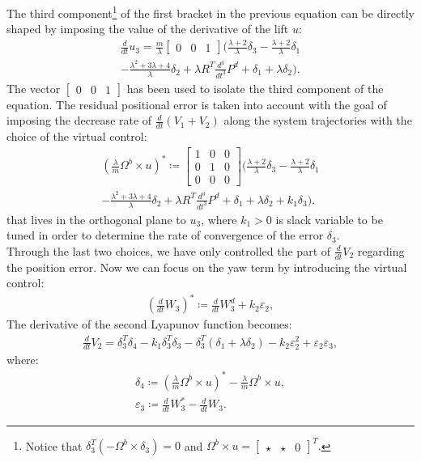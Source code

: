 The third component\footnote{Notice that $\delta_3^T  (-\Omega^b \times \delta_3) = 0$ and $\Omega^b \times u = \begin{bmatrix}
    \star & \star & 0
\end{bmatrix}^T.$} of the first bracket in the previous equation can be directly shaped by imposing the value of the derivative of the lift $u$:
\begin{gather*}
    \frac{d}{dt}u_3 =  \frac{m}{\lambda} \begin{bmatrix}
        0 & 0 & 1 \end{bmatrix} \bigg( \frac{\lambda+2}{\lambda}\delta_3-\frac{\lambda+2}{\lambda}\delta_1 \\ -\frac{\lambda^2+3\lambda+4}{\lambda}\delta_2+\lambda R^T \frac{d^3}{dt^3}P^d+ \delta_1+\lambda \delta_2 \bigg).
\end{gather*}
The vector $\begin{bmatrix}
    0 & 0 & 1
\end{bmatrix}$ has been used to isolate the third component of the equation. The residual positional error is taken into account with the goal of imposing the decrease rate of $\frac{d}{dt} (V_1 + V_2)$ along the system trajectories with the choice of the virtual control:
\begin{gather*}
    \left( \frac{\lambda}{m} \Omega^b \times u \right)^* \coloneq \begin{bmatrix}
        1 & 0 & 0 \\ 0 & 1 & 0 \\ 0 & 0 & 0
    \end{bmatrix} \bigg( \frac{\lambda+2}{\lambda}\delta_3-\frac{\lambda+2}{\lambda}\delta_1 \\ -\frac{\lambda^2+3\lambda+4}{\lambda}\delta_2+\lambda R^T \frac{d^3}{dt^3}P^d+ \delta_1+\lambda \delta_2 + k_1 \delta_3 \bigg).
\end{gather*}
that lives in the orthogonal plane to $u_3$, where $k_1>0$ is slack variable to be tuned in order to determine the rate of convergence of the error $\delta_3$.\\
Through the last two choices, we have only controlled the part of $\frac{d}{dt}V_2$ regarding the position error.
Now we can focus on the yaw term by introducing the virtual control:
\begin{gather*}
    \left( \frac{d}{dt}W_3 \right)^* \coloneq \frac{d}{dt}W_3^d + k_2 \varepsilon_2,
\end{gather*}
The derivative of the second Lyapunov function becomes:
\begin{gather*}
    \frac{d}{dt}V_2 = \delta_3^T \delta_4-k_1 \delta_3^T \delta_3 - \delta_3^T (\delta_1+\lambda \delta_2)  - k_2 \varepsilon_2^2 + \varepsilon_2 \varepsilon_3,
\end{gather*}
where:
\begin{gather*}
    \delta_4 \coloneq \left( \frac{\lambda}{m} \Omega^b \times u \right)^* - \frac{\lambda}{m} \Omega^b \times u, \\
    \varepsilon_3 \coloneq \frac{d}{dt}W_3^* - \frac{d}{dt}W_3.
\end{gather*}


